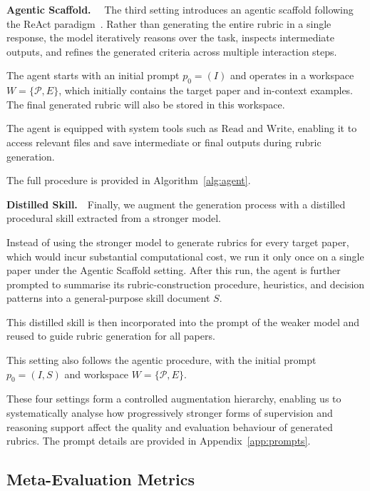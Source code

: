 \documentclass[11pt]{article}
\newif\ifreview
\newcommand{\hh}[1]{%
\ifreview
{\textcolor{orange!90!black}{#1}}
\else
#1
\fi
}
\begin{document}
\noindent\textbf{Agentic Scaffold.}~~
The third setting introduces an agentic scaffold following the ReAct paradigm~\cite{yao2023react}. Rather than generating the entire rubric in a single response, the model iteratively reasons over the task, inspects intermediate outputs, and refines the generated criteria across multiple interaction steps. \hh{The agent starts with an initial prompt $p_0=(I)$ and operates in a workspace $W=\{\mathcal{P},E\}$, which initially contains the target paper and in-context examples. The final generated rubric will also be stored in this workspace.} The agent is equipped with system tools such as $\mathrm{Read}$ and $\mathrm{Write}$, enabling it to access relevant files and save intermediate or final outputs during rubric generation. \hh{The full procedure is provided in Algorithm~\ref{alg:agent}.}

\noindent\textbf{Distilled Skill.}~~Finally, we augment the generation process with a distilled procedural skill extracted from a stronger model. \hh{Instead of using the stronger model to generate rubrics for every target paper, which would incur substantial computational cost, we run it only once on a single paper under the Agentic Scaffold setting. After this run, the agent is further prompted to summarise its rubric-construction procedure, heuristics, and decision patterns into a general-purpose skill document $S$.} This distilled skill is then incorporated into the prompt of the weaker model and reused to guide rubric generation for all papers. \hh{This setting also follows the agentic procedure, with the initial prompt $p_0=(I,S)$ and workspace $W=\{\mathcal{P},E\}$.}

 
These four settings form a controlled augmentation hierarchy, enabling us to systematically analyse how progressively stronger forms of supervision and reasoning support affect the quality and evaluation behaviour of generated rubrics. The prompt details are provided in Appendix~\ref{app:prompts}.

\subsection{Meta-Evaluation Metrics}
\end{document}
